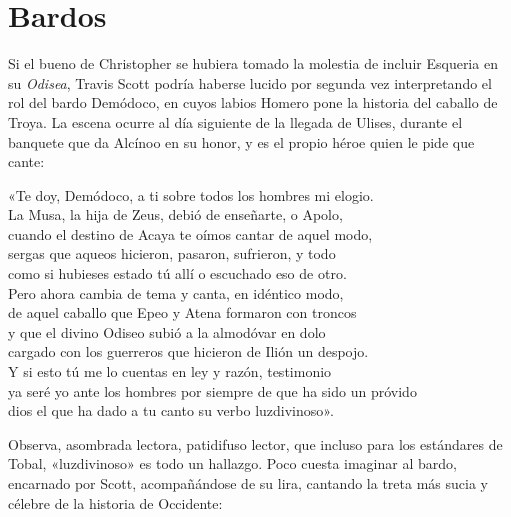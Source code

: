 \section*{Bardos}

Si el bueno de Christopher se hubiera tomado la molestia de incluir Esqueria en su \emph{Odisea}, Travis Scott podría haberse lucido por segunda vez interpretando el rol del bardo Demódoco, en cuyos labios Homero pone la historia del caballo de Troya. La escena ocurre al día siguiente de la llegada de Ulises, durante el banquete que da Alcínoo en su honor, y es el propio héroe quien le pide que cante:

\begin{versocita}
«Te doy, Demódoco, a ti sobre todos los hombres mi elogio.\\
La Musa, la hija de Zeus, debió de enseñarte, o Apolo,\\
cuando el destino de Acaya te oímos cantar de aquel modo,\\
sergas que aqueos hicieron, pasaron, sufrieron, y todo\\
como si hubieses estado tú allí o escuchado eso de otro.\\
Pero ahora cambia de tema y canta, en idéntico modo,\\
de aquel caballo que Epeo y Atena formaron con troncos\\
y que el divino Odiseo subió a la almodóvar en dolo\\
cargado con los guerreros que hicieron de Ilión un despojo.\\
Y si esto tú me lo cuentas en ley y razón, testimonio\\
ya seré yo ante los hombres por siempre de que ha sido un próvido\\
dios el que ha dado a tu canto su verbo luzdivinoso».
\end{versocita}

Observa, asombrada lectora, patidifuso lector, que incluso para los estándares de Tobal, «luzdivinoso» es todo un hallazgo. Poco cuesta imaginar al bardo, encarnado por Scott, acompañándose de su lira, cantando la treta más sucia y célebre de la historia de Occidente:

